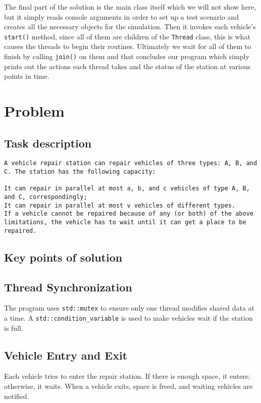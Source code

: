 \documentclass[a4paper,11pt]{article}
\begin{document}
The final part of the solution is the main class itself which we will not show here, but it simply reads console arguments in order to set up a test scenario and creates all the necessary objects for the simulation. Then it invokes each vehicle's {\tt start()} method, since all of them are children of the {\tt Thread} class, this is what causes the threads to begin their routines. Ultimately we wait for all of them to finish by calling {\tt join()} on them and that concludes our program which simply prints out the actions each thread takes and the status of the station at various points in time.

\section*{Problem }

\subsection*{Task description}

\begin{verbatim}
A vehicle repair station can repair vehicles of three types: A, B, and C. The station has the following capacity:

It can repair in parallel at most a, b, and c vehicles of type A, B, and C, correspondingly;
It can repair in parallel at most v vehicles of different types.
If a vehicle cannot be repaired because of any (or both) of the above limitations, the vehicle has to wait until it can get a place to be repaired.
\end{verbatim}

\subsection*{Key points of solution}
\subsection*{Thread Synchronization}
The program uses \texttt{std::mutex} to ensure only one thread modifies shared data at a time. A \texttt{std::condition\_variable} is used to make vehicles wait if the station is full.

\subsection*{Vehicle Entry and Exit}
Each vehicle tries to enter the repair station. If there is enough space, it enters; otherwise, it waits. When a vehicle exits, space is freed, and waiting vehicles are notified.
\end{document}
